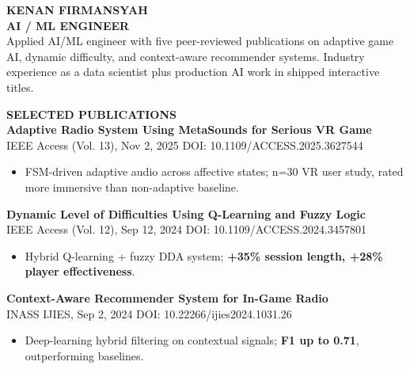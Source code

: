\documentclass[11pt,a4paper]{article}
\newcommand{\mainsection}[1]{%
    {\large\bfseries\MakeUppercase{#1}}\\[8pt]%
}
\begin{document}
\begin{minipage}[t]{14cm}
\vspace{0.5cm}
\hspace{0.8cm}
\begin{minipage}[t]{12.5cm}

{\Huge\bfseries\MakeUppercase{Kenan Firmansyah}}\\[6pt]
{\large\bfseries AI / ML ENGINEER}\\[12pt]

{\small Applied AI/ML engineer with five peer-reviewed publications on adaptive game AI, dynamic difficulty, and context-aware recommender systems. Industry experience as a data scientist plus production AI work in shipped interactive titles.}

\vspace{0.5cm}

\mainsection{Selected Publications}

\textbf{Adaptive Radio System Using MetaSounds for Serious VR Game} \\
{\small IEEE Access (Vol. 13), Nov 2, 2025 \textbar{} DOI: 10.1109/ACCESS.2025.3627544}
\begin{itemize}[leftmargin=*, nosep, itemsep=2pt, topsep=2pt]
    \item FSM-driven adaptive audio across affective states; n=30 VR user study, rated more immersive than non-adaptive baseline.
\end{itemize}

\vspace{0.3cm}

\textbf{Dynamic Level of Difficulties Using Q-Learning and Fuzzy Logic}\\
{\small IEEE Access (Vol. 12), Sep 12, 2024 \textbar{} DOI: 10.1109/ACCESS.2024.3457801}
\begin{itemize}[leftmargin=*, nosep, itemsep=2pt, topsep=2pt]
    \item Hybrid Q-learning + fuzzy DDA system; \textbf{+35\% session length, +28\% player effectiveness}.
\end{itemize}

\vspace{0.3cm}

\textbf{Context-Aware Recommender System for In-Game Radio}\\
{\small INASS IJIES, Sep 2, 2024 \textbar{} DOI: 10.22266/ijies2024.1031.26}
\begin{itemize}[leftmargin=*, nosep, itemsep=2pt, topsep=2pt]
    \item Deep-learning hybrid filtering on contextual signals; \textbf{F1 up to 0.71}, outperforming baselines.
\end{itemize}


\end{minipage}
\end{minipage}
\end{document}
